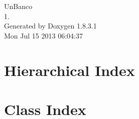 \documentclass{article}
\begin{document}
\hypersetup{pageanchor=false,citecolor=blue}
\begin{titlepage}
\vspace*{7cm}
\begin{center}
{\Large Un\-Banco \\[1ex]\large 1. }\\
\vspace*{1cm}
{\large Generated by Doxygen 1.8.3.1}\\
\vspace*{0.5cm}
{\small Mon Jul 15 2013 06:04:37}\\
\end{center}
\end{titlepage}
\tableofcontents
{}
\hypersetup{pageanchor=true,citecolor=blue}
\section{Hierarchical Index}

\section{Class Index}

\end{document}
